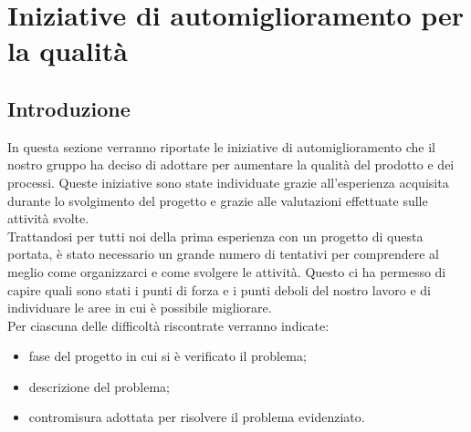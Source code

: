 \section{Iniziative di automiglioramento per la qualità}
\subsection{Introduzione}
In questa sezione verranno riportate le iniziative di automiglioramento che il nostro gruppo ha deciso di adottare per aumentare la qualità del prodotto e dei processi. Queste iniziative sono state individuate grazie all'esperienza acquisita durante lo svolgimento del progetto e grazie alle valutazioni effettuate sulle attività svolte. \\
Trattandosi per tutti noi della prima esperienza con un progetto di questa portata, è stato necessario un grande numero di tentativi per comprendere al meglio come organizzarci e come svolgere le attività. Questo ci ha permesso di capire quali sono stati i punti di forza e i punti deboli del nostro lavoro e di individuare le aree in cui è possibile migliorare. \\
Per ciascuna delle difficoltà riscontrate verranno indicate:
\begin{itemize}
    \item fase del progetto in cui si è verificato il problema;
    \item descrizione del problema;
    \item contromisura adottata per risolvere il problema evidenziato.
\end{itemize}

